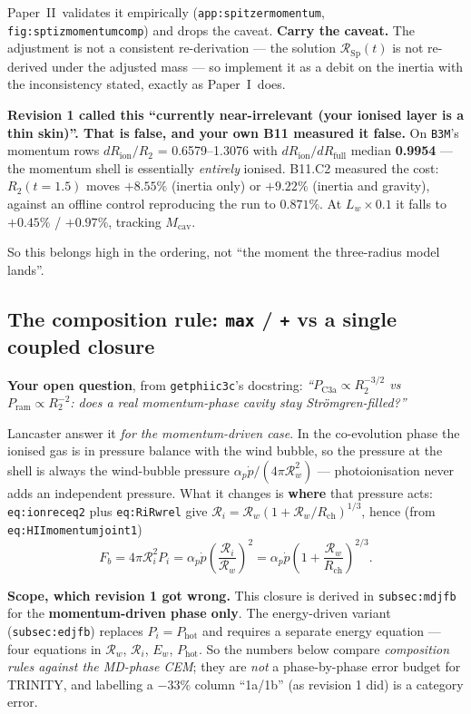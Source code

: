 \documentclass[11pt,a4paper,oneside]{report}
\newcommand{\brkus}{\textunderscore\allowbreak}
\newcommand{\code}[1]{\texttt{\small\let\_\brkus #1}}
\newcommand{\lbl}[1]{\texttt{\footnotesize\let\_\brkus #1}}
\newcommand{\PI}{Paper~I}
\newcommand{\PII}{Paper~II}
\newcommand{\Rw}{\mathcal{R}_{w}}
\newcommand{\Ri}{\mathcal{R}_{i}}
\newcommand{\Rch}{R_{\mathrm{ch}}}
\newcommand{\pdotw}{\dot p}
\newcommand{\ap}{\alpha_p}
\newcommand{\Pram}{P_{\mathrm{ram}}}
\newcommand{\PCa}{P_{\mathrm{C3a}}}
\newcommand{\up}[1]{\textcolor{tqaccent}{\textbf{#1}}}
\begin{document}
\PII\ validates it empirically (\lbl{app:spitzer\_momentum},
\lbl{fig:sptiz\_momentum\_comp}) and drops the caveat. \up{Carry the caveat.} The adjustment
is not a consistent re-derivation --- the solution $\mathcal{R}_{\mathrm{Sp}}(t)$ is not
re-derived under the adjusted mass --- so implement it as a debit on the inertia with the
inconsistency stated, exactly as \PI\ does.

\begin{keybox}
\textbf{\sffamily Revision 1 called this ``currently near-irrelevant (your ionised layer is
a thin skin)''. That is false, and your own B11 measured it false.}
On \code{B3M}'s momentum rows $dR_{\mathrm{ion}}/R_2$ = 0.6579--1.3076 with
$dR_{\mathrm{ion}}/dR_{\mathrm{full}}$ median \up{0.9954} --- the momentum shell is
essentially \emph{entirely} ionised. B11.C2 measured the cost: $R_2(t{=}1.5)$ moves
\up{$+8.55\%$} (inertia only) or \up{$+9.22\%$} (inertia and gravity), against an offline
control reproducing the run to $0.871\%$. At $L_w\times0.1$ it falls to $+0.45\%$ / $+0.97\%$,
tracking $M_{\mathrm{cav}}$.
\end{keybox}

So this belongs high in the ordering, not ``the moment the three-radius model lands''.

\subsection{The composition rule: \texttt{max} / \texttt{+} vs a single coupled closure}
\label{sec:closure}

\textbf{Your open question}, from \code{get\_phii\_c3c}'s docstring:
\emph{``$\PCa\propto R_2^{-3/2}$ vs $\Pram\propto R_2^{-2}$: does a real momentum-phase
cavity stay Str\"omgren-filled?''}

Lancaster answer it \emph{for the momentum-driven case}. In the co-evolution phase the
ionised gas is in pressure balance with the wind bubble, so the pressure at the shell is
always the wind-bubble pressure $\ap\pdotw/(4\pi\Rw^2)$ --- photoionisation never adds an
independent pressure. What it changes is \up{where} that pressure acts: \lbl{eq:ionreceq2}
plus \lbl{eq:RiRw\_rel} give $\Ri=\Rw(1+\Rw/\Rch)^{1/3}$, hence (from
\lbl{eq:HIImomentum\_joint1})
\[
\boxed{\;F_b=4\pi\Ri^2 P_i=\ap\pdotw\left(\frac{\Ri}{\Rw}\right)^{\!2}
=\ap\pdotw\left(1+\frac{\Rw}{\Rch}\right)^{\!2/3}.\;}
\]

\begin{keybox}
\textbf{\sffamily Scope, which revision 1 got wrong.} This closure is derived in
\lbl{subsec:md\_jfb} for the \up{momentum-driven phase only}. The energy-driven variant
(\lbl{subsec:ed\_jfb}) replaces $P_i=P_{\mathrm{hot}}$ and requires a separate energy
equation --- four equations in $\Rw$, $\Ri$, $E_w$, $P_{\mathrm{hot}}$. So the numbers below
compare \emph{composition rules against the MD-phase CEM}; they are \emph{not} a
phase-by-phase error budget for TRINITY, and labelling a $-33\%$ column ``1a/1b'' (as
revision 1 did) is a category error.
\end{keybox}
\end{document}
